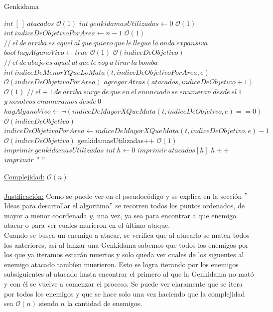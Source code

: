 \documentclass[10pt,a4paper]{article}
\begin{document}
\begin{algorithm}[h!]
\caption{Genkidama}
\begin{algorithmic}
  	\State $int~[~]~ atacados$ \Comment $\mathcal{O}(1)$
  	\State $int ~genkidamasUtilizadas \gets 0$ \Comment $\mathcal{O}(1)$
	\State $int ~indiceDeObjetivoPorArea \gets n - 1$ \Comment $\mathcal{O}(1)$
	\State $ //~el~ de~ arriba~ es~ aquel~ al~ que~ quiero~ que~ le~ llegue~ la~ onda~ expansiva$
	\State $bool ~hayAlgunoVivo \gets true$ \Comment $\mathcal{O}(1)$
	 \Comment $\mathcal{O}(indiceDeObjetivo)$
		\State $ 	//~el~ de~ abajo ~es~ aquel~ al~ que~ le~ voy~ a ~tirar~ la~ bomba$
		\State $int~indiceDeMenorYQueLoMata(t, indiceDeObjetivoPorArea, e)$ \Comment $\mathcal{O}(indiceDeObjetivoPorArea)$
		\State $agregarAtras(atacados, indiceDeObjetivo + 1)$ \Comment $\mathcal{O}(1)$
		\State $		//~el +1 ~de~ arriba~ surge~ de~ que~ en~ el~ enunciado ~se~ enumeran~ desde~ el~ 1 ~$
		\State $	   y~ nosotros~ enumeramos~ desde~ 0$
		\State $hayAlgunoVivo \gets \neg(indiceDeMayorXQueMata(t, indiceDeObjetivo, e) == 0)$ \Comment $\mathcal{O}(indiceDeObjetivo)$
		\State $indiceDeObjetivoPorArea \gets indiceDeMayorXQueMata(t, indiceDeObjetivo, e) - 1$ \Comment $\mathcal{O}(indiceDeObjetivo)$
		\State genkidamasUtilizadas++ \Comment $\mathcal{O}(1)$
	\EndWhile
	\State $imprimir ~genkidamasUtilizadas$
	\State $int~ h \gets 0$
			\State $imprimir ~atacados[h]$
			\State $h++$
					\State $imprimir ~"~"~$
			\EndIf
	\EndWhile
\EndFunction
\end{algorithmic}
\underline{Complejidad:} $\mathcal{O}(n)$\\
\\
\underline{Justificación:} Como se puede ver en el pseudocódigo y se explica en la sección $"$Ideas para desarrollar el algoritmo$"$ se recorren todos los puntos ordenados, de mayor a menor coordenada $y$, una vez, ya sea para encontrar a que enemigo atacar o para ver cuales murieron en el último ataque.\\
Cuando se busca un enemigo a atacar, se verifica que al atacarlo se maten todos los anteriores, así al lanzar una Genkidama sabemos que todos los enemigos por los que ya iteramos estarán muertos y solo queda ver cuales de los siguentes al enemigo atacado tambíen muerieron. Esto se logra iterando por los enemigos subsiguientes al atacado hasta encontrar el primero al que la Genkidama no mató y con él se vuelve a comenzar el proceso. Se puede ver claramente que se itera por todos los enemigos y que se hace solo una vez haciendo que la complejidad sea $\mathcal{O}(n)$ siendo $n$ la cantidad de enemigos.
    
\end{algorithm}
\end{document}
